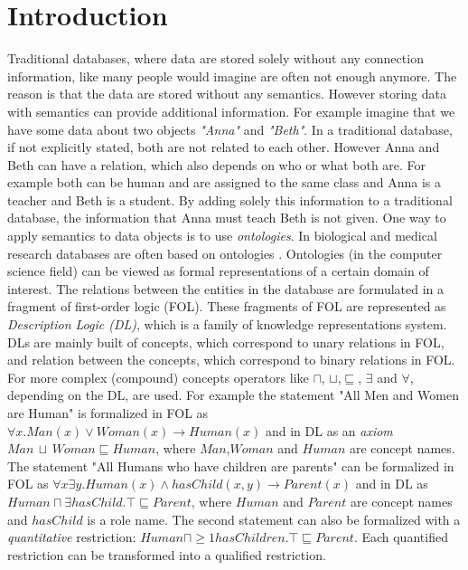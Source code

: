 \documentclass{book}
\theoremstyle{break}
\theoremstyle{definition}
\begin{document}
\chapter{Introduction}
Traditional databases, where data are stored solely without any connection information, like many people would imagine are often not enough anymore. The reason is that the data are stored without any semantics. However storing data with semantics can provide additional information. For example imagine that we have some data about two objects \textit{"Anna"} and \textit{"Beth"}. In a traditional database, if not explicitly stated, both are not related to each other. However Anna and Beth can have a relation, which also depends on who or what both are. For example both can be human and are assigned to the same class and Anna is a teacher and Beth is a student. By adding solely this information to a traditional database, the information that Anna must teach Beth is not given. One way to apply semantics to data objects is to use \textit{ontologies}. In biological and medical research databases are often based on ontologies \cite{bio}. Ontologies (in the computer science field) can be viewed as formal representations of a certain domain of interest. The relations between the entities in the database are formulated in a fragment of first-order logic (FOL). These fragments of FOL are represented as \textit{Description Logic (DL)}, which is a family of knowledge representations system. DLs are mainly built of concepts, which correspond to unary relations in FOL, and relation between the concepts, which correspond to binary relations in FOL. For more complex (compound) concepts operators like $\sqcap$, $\sqcup$,$\sqsubseteq$, $\exists$ and $\forall$, depending on the DL, are used. For example the statement "All Men and Women are Human" is formalized in FOL as $\forall x.Man(x)\vee Woman(x)\rightarrow Human(x)$ and in DL as an \textit{axiom} $Man\, \sqcup\, Woman\sqsubseteq Human$, where $Man$,$Woman$ and $Human$ are concept names. The statement "All Humans who have children are parents" can be formalized in FOL as $\forall x \exists y. Human(x)\wedge hasChild(x,y)\rightarrow Parent(x)$ and in DL as $Human\sqcap \exists hasChild.\top \sqsubseteq Parent$, where $Human$ and $Parent$ are concept names and $hasChild$ is a role name. The second statement can also be formalized with a \textit{quantitative} restriction: $Human \sqcap \geq 1 hasChildren.\top\sqsubseteq Parent$. Each quantified restriction can be transformed into a qualified restriction.\\
\end{document}
